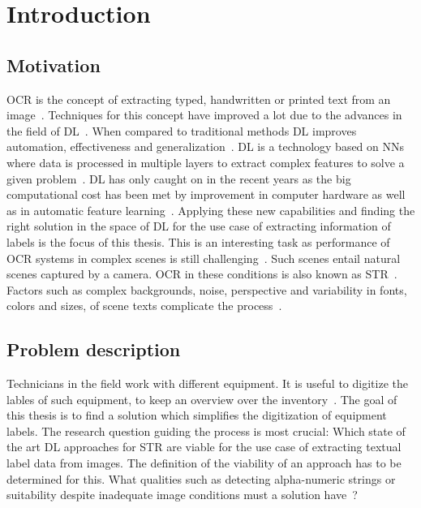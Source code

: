 \chapter{Introduction}\label{ch:intro}
\section{Motivation}
\ac{OCR} is the concept of extracting typed, handwritten or printed text
from an image~\cite{zhao_improving_2020}.
Techniques for this concept have improved a lot due to the advances in the field of
\ac{DL}~\citep{zhao_improving_2020}.
When compared to traditional methods \ac{DL} improves automation, effectiveness and
generalization~\citep{chen_text_2021}.
\ac{DL} is a technology based on \acp{NN} where data is processed
in multiple layers to extract complex features to solve a given problem~\citep{shrestha_review_2019}.
\ac{DL} has only caught on in the recent years as the big computational cost has been met
by improvement in computer hardware as well as in automatic feature
learning~\citep{ponti_everything_2017, chen_text_2021}.
Applying these new capabilities and finding the right solution in the space of \ac{DL} for the
use case of extracting information of labels is the focus of this thesis.
This is an interesting task as performance of \ac{OCR} systems in complex scenes is still
challenging~\citep{zhao_improving_2020}.
Such scenes entail natural scenes captured by a camera.
\ac{OCR} in these conditions is also known as \ac{STR}~\citep{chen_text_2021, baek_what_2019}.
Factors such as complex backgrounds, noise, perspective and variability in fonts, colors and sizes,
of scene texts complicate the process~\citep{hu_gtc_2020,chen_text_2021,baek_what_2019}.

\section{Problem description}\label{se:problem}
Technicians in the field work with different equipment.
It is useful to digitize the lables of such equipment, to keep an overview over the
inventory~\citep{abramowicz_business_2019}.
The goal of this thesis is to find a solution which simplifies the digitization of equipment labels.
The research question guiding the process is most crucial: Which state of the art \ac{DL}
approaches for \ac{STR} are viable for the use case of extracting textual label data from images.
The definition of the viability of an approach has to be determined for this.
What qualities such as detecting alpha-numeric strings or suitability despite
inadequate image conditions must a solution have~\citep{ghosh_visual_2017, hu_gtc_2020}?

